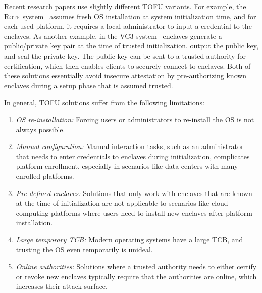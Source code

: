 Recent research papers use slightly different TOFU variants. For example, the \textsc{Rote} system~\cite{matetic2017rote} assumes fresh OS installation at system initialization time, and for each used platform, it requires a local administrator to input a credential to the enclaves. As another example, in the \textsc{VC3} system~\cite{schuster2015vc3} enclaves generate a public/private key pair at the time of trusted initialization, output the public key, and seal the private key. The public key can be sent to a trusted authority for certification, which then enables clients to securely connect to enclaves. Both of these solutions essentially avoid insecure attestation by pre-authorizing known enclaves during a setup phase that is assumed trusted. 

In general, TOFU solutions suffer from the following limitations:

\begin{enumerate}
  \item \emph{OS re-installation:} Forcing users or administrators to re-install the OS is not always possible. 
  
  \item \emph{Manual configuration:} Manual interaction tasks, such as an administrator that needs to enter credentials to enclaves during initialization, complicates platform enrollment, especially in scenarios like data centers with many enrolled platforms.

  \item \emph{Pre-defined enclaves:} Solutions that only work with enclaves that are known at the time of initialization are not applicable to scenarios like cloud computing platforms where users need to install new enclaves after platform installation. 

  \item \emph{Large temporary TCB:} Modern operating systems have a large TCB, and trusting the OS even temporarily is unideal.

  \item \emph{Online authorities:} Solutions where a trusted authority needs to either certify or revoke new enclaves typically require that the authorities are online, which increases their attack surface.
\end{enumerate}


